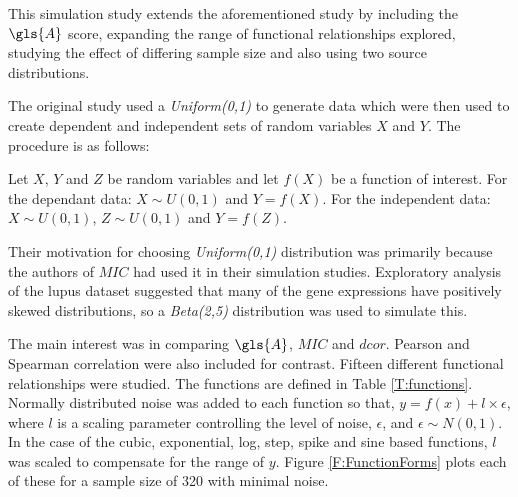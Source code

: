 \documentclass[a4paper, 12pt]{report}
\begin{document}
This simulation study extends the aforementioned study by including the $\gls{A}$ score, expanding the range of functional relationships explored, studying the effect of differing sample size and also using two source distributions. 

The original study used a \textit{Uniform(0,1)} to generate data which were then used to create dependent and independent sets of random variables $X$ and $Y$. The procedure is as follows: 

Let $X$, $Y$ and $Z$ be random variables and let $f(X)$ be a function of interest. For the dependant data: $X\sim U(0,1)$ and $Y = f(X)$. For the independent data: $X\sim U(0,1)$, $Z\sim U(0,1)$  and $Y = f(Z)$.


Their motivation for choosing \textit{Uniform(0,1)} distribution was primarily because the authors of $MIC$ had used it in their simulation studies\cite{Tibshirani2011, mic2011}. Exploratory analysis of the lupus dataset suggested that many of the gene expressions have positively skewed distributions, so a \textit{Beta(2,5)} distribution was used to simulate this. 

The main interest was in comparing $\gls{A}$, $MIC$ and $dcor$.  Pearson and Spearman correlation were also included for contrast. Fifteen different functional relationships were studied. The functions are defined in Table \ref{T:functions}. Normally distributed noise was added to each function so that, $y = f(x) + l \times \epsilon$, where $l$ is a scaling parameter controlling the level of noise, $\epsilon$, and $\epsilon \sim N(0, 1)$. In the case of the cubic, exponential, log, step, spike and sine based functions, $l$ was scaled to compensate for the range of $y$. Figure \ref{F:FunctionForms} plots each of these for a sample size of 320 with minimal noise.
\end{document}
